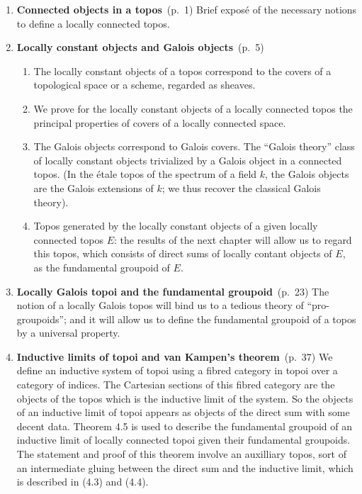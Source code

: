 \documentclass[10pt,oneside]{amsart}
\newcommand{\oldpage}[1]{\marginnote{\textbf{#1}}}
\begin{document}
\begin{enumerate}[label=\arabic*.]
  \item \textbf{Connected objects in a topos}~(p.~1)
    Brief expos\'e of the necessary notions to define a locally connected topos.
  \item \textbf{Locally constant objects and Galois objects}~(p.~5)
    \begin{enumerate}[label=2.\arabic*.]
      \item The locally constant objects of a topos correspond to the covers of a topological space or a scheme, regarded as sheaves.
      \item We prove for the locally constant objects of a locally connected topos the principal properties of covers of a locally connected space.
      \item The Galois objects correspond to Galois covers.
        The ``Galois theory'' class of locally constant objects trivialized by a Galois object in a connected topos.
        (In the \'etale topos of the spectrum of a field $k$, the Galois objects are the Galois extensions of $k$;
        we thus recover the classical Galois theory).
      \item Topos generated by the locally constant objects of a given locally connected topos $E$:
        the results of the next chapter will allow us to regard this topos, which consists of direct sums of locally contant objects of $E$, as the fundamental groupoid of $E$.
    \end{enumerate}
  \item \textbf{Locally Galois topoi and the fundamental groupoid}~(p.~23)
    The notion of a locally Galois topos will bind us to a tedious theory of ``pro-groupoids'';
    and it will allow us to define the fundamental groupoid of a topos by a universal property.
  \item \textbf{Inductive limits of topoi and van Kampen's theorem}~(p.~37)
    We define an inductive system of topoi using a fibred category in topoi over a category of indices.
    The Cartesian sections of this fibred category \oldpage{II} are the objects of the topos which is the inductive limit of the system.
    So the objects of an inductive limit of topoi appears as objects of the direct sum with some decent data.
    Theorem 4.5 is used to describe the fundamental groupoid of an inductive limit of locally connected topoi given their fundamental groupoids.
    The statement and proof of this theorem involve an auxilliary topos, sort of an intermediate gluing between the direct sum and the inductive limit, which is described in (4.3) and (4.4).

\end{enumerate}
\end{document}
